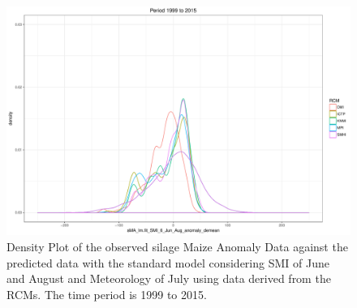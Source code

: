 \documentclass[12pt]{iopart}
\begin{document}



\begin{figure}
	\label{density:2f}
	\centering
	\includegraphics[width=1\textwidth]{figures/Density_climate_1999-2015_RCMs.pdf}
	\caption{Density Plot of the observed silage Maize Anomaly Data against the predicted data with the standard model considering SMI of June and August and
		Meteorology of July using data derived from the RCMs. The time period is 1999 to 2015.}
\end{figure}


\end{document}
